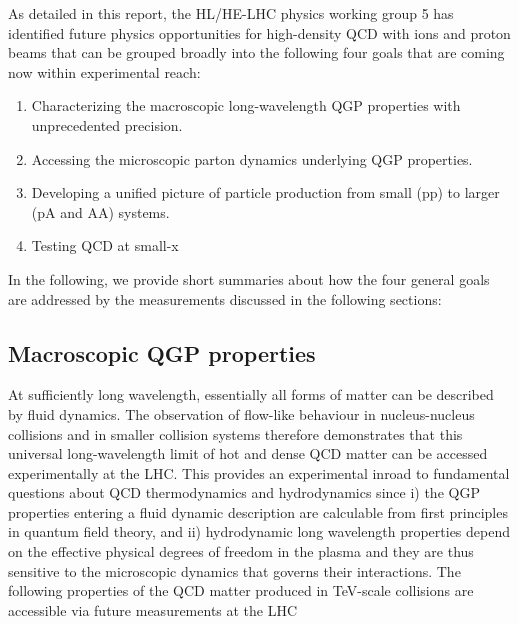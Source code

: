 \documentclass[../report.tex]{subfiles}
\begin{document}
As detailed in this report, the HL/HE-LHC physics working group 5 has identified future physics opportunities for high-density QCD with ions and proton beams that can be grouped broadly into the following four goals that are coming now within experimental reach:
\begin{enumerate}
	\item Characterizing the macroscopic long-wavelength QGP properties with unprecedented precision. 
\item Accessing the microscopic parton dynamics underlying QGP properties.
\item Developing a unified picture of particle production from small (pp) to larger (pA and AA) systems.
\item Testing QCD at small-x
\end{enumerate}
 
In the following, we provide short summaries about how the four general goals are addressed by the measurements discussed in the following sections:

\subsection{Macroscopic QGP properties}
At sufficiently long wavelength, essentially all forms of matter can be described by fluid dynamics. The observation of flow-like behaviour in nucleus-nucleus collisions and in smaller collision systems therefore demonstrates that this universal long-wavelength limit of hot and dense QCD matter can be accessed experimentally at the LHC. This provides an experimental inroad to fundamental questions about QCD thermodynamics and hydrodynamics since i) the QGP properties entering a fluid dynamic description are calculable from first principles in quantum field theory, and ii) hydrodynamic long wavelength properties depend on the effective physical degrees of freedom in the plasma and they are thus sensitive to the microscopic dynamics that governs their interactions. The following properties of the QCD matter produced in TeV-scale collisions
are accessible via future measurements at the LHC
\end{document}
